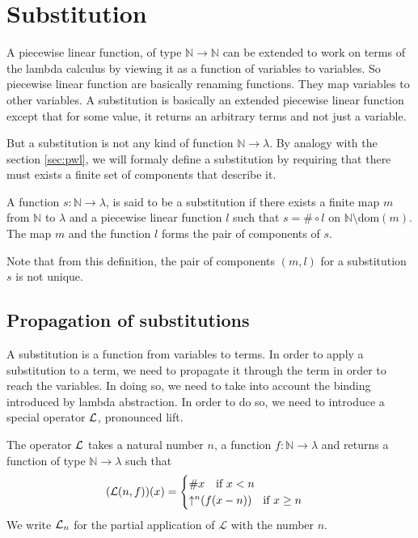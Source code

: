 
\section{Substitution}\label{sec:substitution}

A piecewise linear function, of type $\mathbb{N} \to \mathbb{N}$ can be extended
to work on terms of the lambda calculus by viewing it as a function of variables
to variables. So piecewise linear function are basically renaming functions.
They map variables to other variables. A substitution is basically an extended
piecewise linear function except that for some value, it returns an arbitrary
terms and not just a variable.

But a substitution is not any kind of function $\mathbb{N} \to \lambda$. By
analogy with the section \ref{sec:pwl}, we will formaly define a substitution by
requiring that there must exists a finite set of components that describe it.
\begin{definition}
  \label{def:subst}
  A function $s : \mathbb{N} \to \lambda$, is said to be a substitution if there
  exists a finite map $m$ from $\mathbb{N}$ to $\lambda$ and a piecewise linear
  function $l$ such that $s = \# \circ l$ on $\mathbb{N} \setminus
  \text{dom}(m)$. The map $m$ and the function $l$ forms the pair of components
  of $s$.
\end{definition}
Note that from this definition, the pair of components $(m, l)$ for a
substitution $s$ is not unique. 

\subsection{Propagation of substitutions}\label{sec:subst_propagation} 

A substitution is a function from variables to terms. In order to apply a
substitution to a term, we need to propagate it through the term in order to
reach the variables. In doing so, we need to take into account the binding
introduced by lambda abstraction. In order to do so, we need to introduce a
special operator $\liftop$, pronounced lift. 
\begin{definition}
  The operator $\liftop$ takes a natural number $n$, a function
  $f : \mathbb{N} \to \lambda$ and returns a function of type $\mathbb{N} \to
  \lambda$ such that
  \begin{equation}
    (\liftop(n, f))(x) = \begin{cases}
      \#x \quad \text{if $x < n$} \\
      \shift[n] (f(x - n)) \quad \text{if $x \ge n$}
    \end{cases}
  \end{equation}
  We write $\lift[n]$ for the partial application of $\mathcal{L}$ with the number $n$.
\end{definition}

